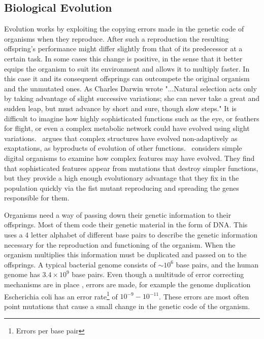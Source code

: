 \documentclass[a4paper,12pt]{article}
\begin{document}
	
	\subsection{Biological Evolution}\label{chap:evolution}
	
	Evolution works by exploiting the copying errors made in the genetic code of organisms when they reproduce. After such a reproduction the resulting offspring's performance might differ slightly from that of its predecessor at a certain task. In some cases this change is positive, in the sense that it better equips the organism to suit its environment and allows it to multiply faster. In this case it and its consequent offsprings can outcompete the original organism and the unmutated ones. As Charles Darwin wrote "...Natural selection acts only by taking advantage of slight successive variations; she can never take a great and sudden leap, but must advance by short and sure, though slow steps." \cite{darwin} 
	It is difficult to imagine how highly sophisticated functions such as the eye, or feathers for flight, or even a complex metabolic network could have evolved using slight variations. \cite{latent}~argues that complex structures have evolved non-adaptively as exaptations, as byproducts of evolution of other functions. \cite{complexfeatures}~considers simple digital organisms to examine how complex features may have evolved. They find that sophisticated features appear from mutations that destroy simpler functions, but they provide a high enough evolutionary advantage that they fix in the population quickly via the fist mutant reproducing and spreading the genes responsible for them. 
	

	Organisms need a way of passing down their genetic information to their offsprings. 
	Most of them code their genetic material in the form of DNA. This uses a 4 letter alphabet of different base pairs to describe the genetic information necessary for the reproduction and functioning of the organism. When the organism multiplies this information must be duplicated and passed on to the offsprings. A typical bacterial genome consists of $\sim 10^6$ base pairs, and the human genome has $3.4 \times 10^9$ base pairs. Even though a multitude of error correcting mechanisms are in place \cite{dnarepair}, errors are made, for example the genome duplication Escherichia coli has an error rate\footnote{Errors per base pair} of $10^{-9} - 10^{-11}$\cite{ecolierrorrate}. These errors are most often point mutations that cause a small change in the genetic code of the organism.
	
\end{document}
